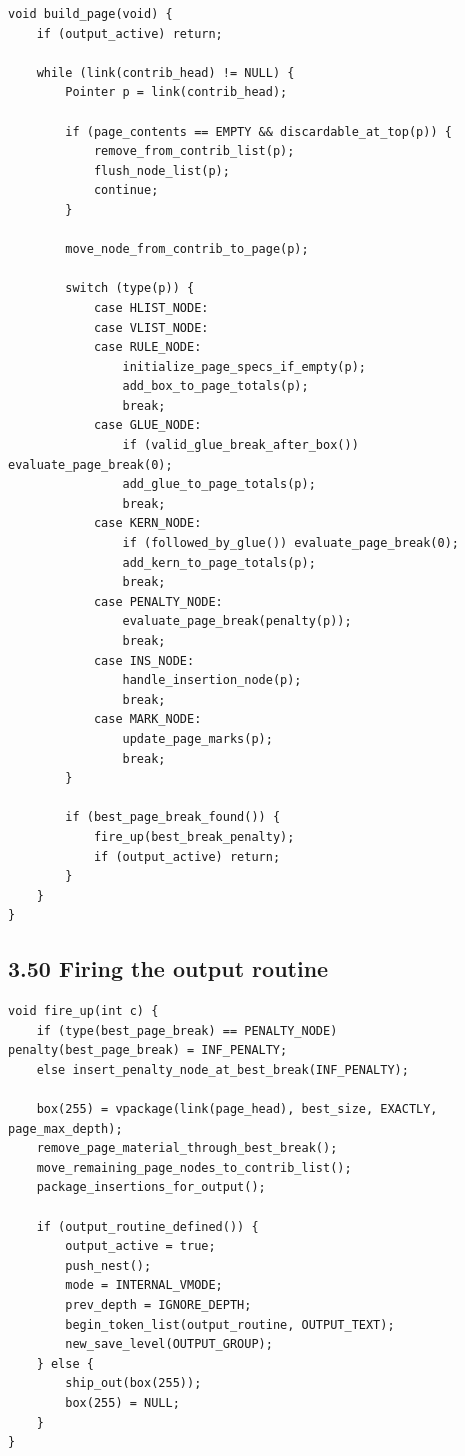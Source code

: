 \documentclass[11pt]{article}
\begin{document}
\begin{verbatim}
void build_page(void) {
    if (output_active) return;

    while (link(contrib_head) != NULL) {
        Pointer p = link(contrib_head);

        if (page_contents == EMPTY && discardable_at_top(p)) {
            remove_from_contrib_list(p);
            flush_node_list(p);
            continue;
        }

        move_node_from_contrib_to_page(p);

        switch (type(p)) {
            case HLIST_NODE:
            case VLIST_NODE:
            case RULE_NODE:
                initialize_page_specs_if_empty(p);
                add_box_to_page_totals(p);
                break;
            case GLUE_NODE:
                if (valid_glue_break_after_box()) evaluate_page_break(0);
                add_glue_to_page_totals(p);
                break;
            case KERN_NODE:
                if (followed_by_glue()) evaluate_page_break(0);
                add_kern_to_page_totals(p);
                break;
            case PENALTY_NODE:
                evaluate_page_break(penalty(p));
                break;
            case INS_NODE:
                handle_insertion_node(p);
                break;
            case MARK_NODE:
                update_page_marks(p);
                break;
        }

        if (best_page_break_found()) {
            fire_up(best_break_penalty);
            if (output_active) return;
        }
    }
}
\end{verbatim}

\subsection{3.50 Firing the output
routine}\label{firing-the-output-routine}

\begin{verbatim}
void fire_up(int c) {
    if (type(best_page_break) == PENALTY_NODE) penalty(best_page_break) = INF_PENALTY;
    else insert_penalty_node_at_best_break(INF_PENALTY);

    box(255) = vpackage(link(page_head), best_size, EXACTLY, page_max_depth);
    remove_page_material_through_best_break();
    move_remaining_page_nodes_to_contrib_list();
    package_insertions_for_output();

    if (output_routine_defined()) {
        output_active = true;
        push_nest();
        mode = INTERNAL_VMODE;
        prev_depth = IGNORE_DEPTH;
        begin_token_list(output_routine, OUTPUT_TEXT);
        new_save_level(OUTPUT_GROUP);
    } else {
        ship_out(box(255));
        box(255) = NULL;
    }
}
\end{verbatim}
\end{document}

